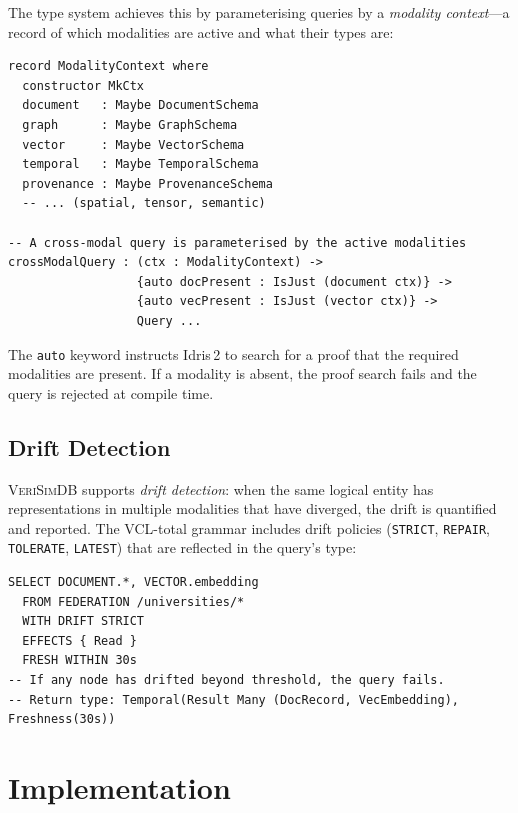 \documentclass[11pt,a4paper]{article}
\newcommand{\VeriSimDB}{\textsc{VeriSimDB}}
\begin{document}
The type system achieves this by parameterising queries by a
\emph{modality context}---a record of which modalities are active
and what their types are:

\begin{lstlisting}[language=Idris2]
record ModalityContext where
  constructor MkCtx
  document   : Maybe DocumentSchema
  graph      : Maybe GraphSchema
  vector     : Maybe VectorSchema
  temporal   : Maybe TemporalSchema
  provenance : Maybe ProvenanceSchema
  -- ... (spatial, tensor, semantic)

-- A cross-modal query is parameterised by the active modalities
crossModalQuery : (ctx : ModalityContext) ->
                  {auto docPresent : IsJust (document ctx)} ->
                  {auto vecPresent : IsJust (vector ctx)} ->
                  Query ...
\end{lstlisting}

The \texttt{auto} keyword instructs Idris\,2 to search for a proof
that the required modalities are present.  If a modality is absent,
the proof search fails and the query is rejected at compile time.

\subsection{Drift Detection}

\VeriSimDB{} supports \emph{drift detection}: when the same logical
entity has representations in multiple modalities that have diverged,
the drift is quantified and reported.  The VCL-total grammar includes
drift policies (\texttt{STRICT}, \texttt{REPAIR}, \texttt{TOLERATE},
\texttt{LATEST}) that are reflected in the query's type:

\begin{lstlisting}[language=VCL]
SELECT DOCUMENT.*, VECTOR.embedding
  FROM FEDERATION /universities/*
  WITH DRIFT STRICT
  EFFECTS { Read }
  FRESH WITHIN 30s
-- If any node has drifted beyond threshold, the query fails.
-- Return type: Temporal(Result Many (DocRecord, VecEmbedding), Freshness(30s))
\end{lstlisting}

\section{Implementation}\label{sec:implementation}
\end{document}
